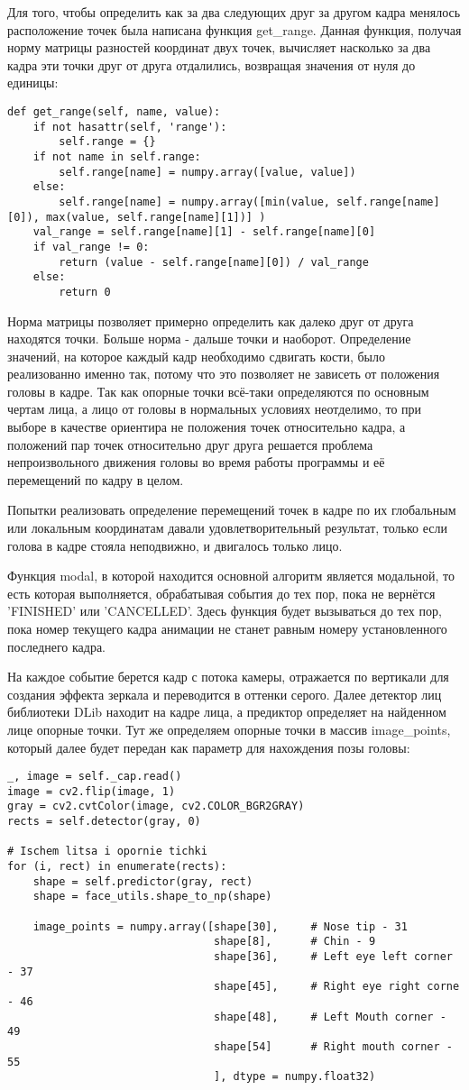 Для того, чтобы определить как за два следующих друг за другом кадра менялось расположение точек была написана функция get\_range. Данная функция, получая норму матрицы разностей координат двух точек, вычисляет насколько за два кадра эти точки друг от друга отдалились, возвращая значения от нуля до единицы:
\begin{lstlisting}
def get_range(self, name, value):
	if not hasattr(self, 'range'):
		self.range = {}
	if not name in self.range:
		self.range[name] = numpy.array([value, value])
	else:
		self.range[name] = numpy.array([min(value, self.range[name][0]), max(value, self.range[name][1])] )
	val_range = self.range[name][1] - self.range[name][0]
	if val_range != 0:
		return (value - self.range[name][0]) / val_range
	else:
		return 0
\end{lstlisting}

Норма матрицы позволяет примерно определить как далеко друг от друга находятся точки. Больше норма - дальше точки и наоборот. Определение значений, на которое каждый кадр необходимо сдвигать кости, было реализованно именно так, потому что это позволяет не зависеть от положения головы в кадре. Так как опорные точки всё-таки определяются по основным чертам лица, а лицо от головы в нормальных условиях неотделимо, то при выборе в качестве ориентира не положения точек относительно кадра, а положений пар точек относительно друг друга решается проблема непроизвольного движения головы во время работы программы и её перемещений по кадру в целом.

Попытки реализовать определение перемещений точек в кадре по их глобальным или локальным координатам давали удовлетворительный результат, только если голова в кадре стояла неподвижно, и двигалось только лицо.

Функция modal, в которой находится основной алгоритм является модальной, то есть которая выполняется, обрабатывая события до тех пор, пока не вернётся {'FINISHED'} или {'CANCELLED'}. Здесь функция будет вызываться до тех пор, пока номер текущего кадра анимации не станет равным номеру установленного последнего кадра.

На каждое событие берется кадр с потока камеры, отражается по вертикали для создания эффекта зеркала и переводится в оттенки серого. Далее детектор лиц библиотеки DLib находит на кадре лица, а предиктор определяет на найденном лице опорные точки. Тут же определяем опорные точки в массив image\_points, который далее будет передан как параметр для нахождения позы головы:
\begin{lstlisting}
_, image = self._cap.read()
image = cv2.flip(image, 1)
gray = cv2.cvtColor(image, cv2.COLOR_BGR2GRAY)
rects = self.detector(gray, 0)

# Ischem litsa i opornie tichki
for (i, rect) in enumerate(rects):
	shape = self.predictor(gray, rect)
	shape = face_utils.shape_to_np(shape)
	
	image_points = numpy.array([shape[30],     # Nose tip - 31
								shape[8],      # Chin - 9
								shape[36],     # Left eye left corner - 37
								shape[45],     # Right eye right corne - 46
								shape[48],     # Left Mouth corner - 49
								shape[54]      # Right mouth corner - 55
								], dtype = numpy.float32)
\end{lstlisting}

